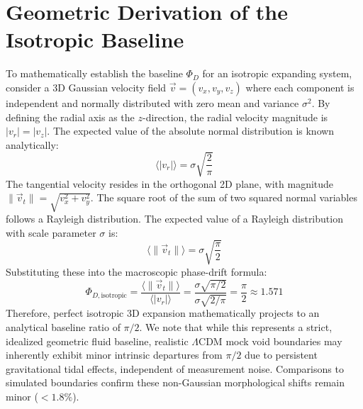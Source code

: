 \documentclass[trackchanges]{aastex631}
\begin{document}
\section{Geometric Derivation of the Isotropic Baseline}
\label{sec:appendix_a}
To mathematically establish the baseline $\Phi_D$ for an isotropic expanding system, consider a 3D Gaussian velocity field $\vec{v} = (v_x, v_y, v_z)$ where each component is independent and normally distributed with zero mean and variance $\sigma^2$. By defining the radial axis as the $z$-direction, the radial velocity magnitude is $|v_r| = |v_z|$. The expected value of the absolute normal distribution is known analytically:
\begin{equation}
\langle |v_r| \rangle = \sigma \sqrt{\frac{2}{\pi}}
\tag{A1}
\end{equation}
The tangential velocity resides in the orthogonal 2D plane, with magnitude $\|\vec{v}_t\| = \sqrt{v_x^2 + v_y^2}$. The square root of the sum of two squared normal variables follows a Rayleigh distribution. The expected value of a Rayleigh distribution with scale parameter $\sigma$ is:
\begin{equation}
\langle \|\vec{v}_t\| \rangle = \sigma \sqrt{\frac{\pi}{2}}
\tag{A2}
\end{equation}
Substituting these into the macroscopic phase-drift formula:
\begin{equation}
\Phi_{D,\text{isotropic}} = \frac{\langle \|\vec{v}_t\| \rangle}{\langle |v_r| \rangle} = \frac{\sigma\sqrt{\pi/2}}{\sigma\sqrt{2/\pi}} = \frac{\pi}{2} \approx 1.571
\tag{A3}
\end{equation}
Therefore, perfect isotropic 3D expansion mathematically projects to an analytical baseline ratio of $\pi/2$. We note that while this represents a strict, idealized geometric fluid baseline, realistic $\Lambda\text{CDM}$ mock void boundaries may inherently exhibit minor intrinsic departures from $\pi/2$ due to persistent gravitational tidal effects, independent of measurement noise. Comparisons to simulated boundaries confirm these non-Gaussian morphological shifts remain minor ($<1.8\%$).
\end{document}
